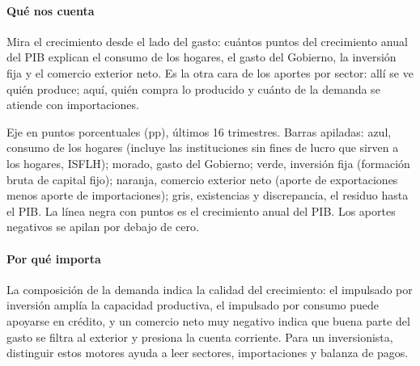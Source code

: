 \paragraph{Qué nos cuenta}
Mira el crecimiento desde el lado del gasto: cuántos puntos del crecimiento anual del PIB explican el consumo de los hogares, el gasto del Gobierno, la inversión fija y el comercio exterior neto. Es la otra cara de los aportes por sector: allí se ve quién produce; aquí, quién compra lo producido y cuánto de la demanda se atiende con importaciones.

\begin{leer}
Eje en puntos porcentuales (pp), últimos 16 trimestres. Barras apiladas: azul, consumo de los hogares (incluye las instituciones sin fines de lucro que sirven a los hogares, ISFLH); morado, gasto del Gobierno; verde, inversión fija (formación bruta de capital fijo); naranja, comercio exterior neto (aporte de exportaciones menos aporte de importaciones); gris, existencias y discrepancia, el residuo hasta el PIB. La línea negra con puntos es el crecimiento anual del PIB. Los aportes negativos se apilan por debajo de cero.
\end{leer}

\paragraph{Por qué importa}
La composición de la demanda indica la calidad del crecimiento: el impulsado por inversión amplía la capacidad productiva, el impulsado por consumo puede apoyarse en crédito, y un comercio neto muy negativo indica que buena parte del gasto se filtra al exterior y presiona la cuenta corriente. Para un inversionista, distinguir estos motores ayuda a leer sectores, importaciones y balanza de pagos.

